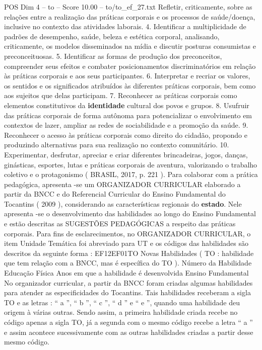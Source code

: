 \begin{textsample}{POS Dim 4 – to – Score 10.00 – to/to\_ef\_27.txt}
Refletir, criticamente, sobre as relações entre a realização das práticas corporais e os processos de saúde/doença, inclusive no contexto das atividades laborais. 4.
Identificar a multiplicidade de padrões de desempenho, saúde, beleza e estética corporal, analisando, criticamente, os modelos disseminados na mídia e discutir posturas consumistas e preconceituosas. 5.
Identificar as formas de produção dos preconceitos, compreender seus efeitos e combater posicionamentos discriminatórios em relação às práticas corporais e aos seus participantes. 6.
Interpretar e recriar os valores, os sentidos e os significados atribuídos às diferentes práticas corporais, bem como aos sujeitos que delas participam. 7.
Reconhecer as práticas corporais como elementos constitutivos da \textbf{identidade} cultural dos povos e grupos. 8.
Usufruir das práticas corporais de forma autônoma para potencializar o envolvimento em contextos de lazer, ampliar as redes de sociabilidade e a promoção da saúde. 9.
Reconhecer o acesso às práticas corporais como direito do cidadão, propondo e produzindo alternativas para sua realização no contexto comunitário. 10.
Experimentar, desfrutar, apreciar e criar diferentes brincadeiras, jogos, danças, ginásticas, esportes, lutas e práticas corporais de aventura, valorizando o trabalho coletivo e o protagonismo ( BRASIL, 2017, p. 221 ).
Para colaborar com a prática pedagógica, apresenta -se um ORGANIZADOR CURRICULAR elaborado a partir da BNCC e do Referencial Curricular do Ensino Fundamental do Tocantins ( 2009 ), considerando as características regionais do \textbf{estado}.
Nele apresenta -se o desenvolvimento das habilidades ao longo do Ensino Fundamental e estão descritas as SUGESTÕES PEDAGÓGICAS a respeito das práticas corporais.
Para fins de esclarecimentos, no ORGANIZADOR CURRICULAR, o item Unidade Temática foi abreviado para UT e os códigos das habilidades são descritos da seguinte forma : EF12EF01TO Novas Habilidades ( TO : habilidade que tem relação com a BNCC, mas é específica do TO ).
Número da Habilidade Educação Física Anos em que a habilidade é desenvolvida Ensino Fundamental No organizador curricular, a partir da BNCC foram criadas algumas habilidades para atender as especificidades do Tocantins.
Tais habilidades receberam a sigla TO e as letras : “ a ”, “ b ”, “ c ”, “ d ” e “ e ”, quando uma habilidade deu origem à várias outras.
Sendo assim, a primeira habilidade criada recebe no código apenas a sigla TO, já a segunda com o mesmo código recebe a letra “ a ” e assim acontece sucessivamente com as outras habilidades criadas a partir desse mesmo código.

\end{textsample}
